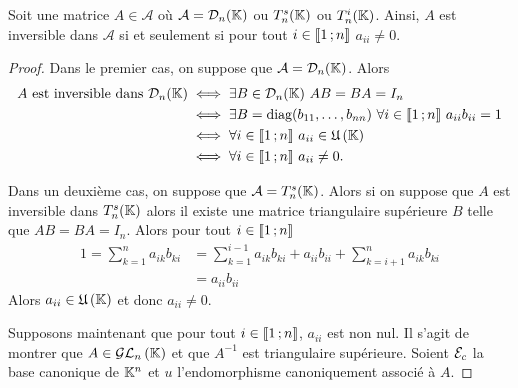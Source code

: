 \begin{prop}
  Soit une matrice \(A \in \mathcal{A}\) où \(\mathcal{A}=\mathcal{D}_n(\mathbb{K})\) ou \(T_n^s(\mathbb{K})\) ou \(T_n^i(\mathbb{K})\). Ainsi, \(A\) est inversible dans \(\mathcal{A}\) si et seulement si pour tout \(i \in \mathopen{\llbracket}1\mathclose{}\mathpunct{};n\mathclose{\rrbracket}\) \(a_{ii} \neq 0\).
\end{prop}
\begin{proof}
  Dans le premier cas, on suppose que \(\mathcal{A}=\mathcal{D}_n(\mathbb{K})\). Alors
  \begin{align}
    A \text{~est inversible dans } \mathcal{D}_n(\mathbb{K}) &\iff \exists B \in \mathcal{D}_n(\mathbb{K}) \ AB=BA=I_n \\
                                             &\iff \exists B = \text{diag}(b_{11}, \ldots, b_{nn}) \ \forall i \in \mathopen{\llbracket}1\mathclose{}\mathpunct{};n\mathclose{\rrbracket} \ a_{ii}b_{ii}=1\\
                                             &\iff \forall i \in \mathopen{\llbracket}1\mathclose{}\mathpunct{};n\mathclose{\rrbracket} \ a_{ii} \in \mathfrak{U}\left(\mathbb{K}\right)\\
                                             &\iff \forall i \in \mathopen{\llbracket}1\mathclose{}\mathpunct{};n\mathclose{\rrbracket} \ a_{ii} \neq 0.
  \end{align}

  Dans un deuxième cas, on suppose que \(\mathcal{A}=T_n^s(\mathbb{K})\). Alors si on suppose que \(A\) est inversible dans \(T_n^s(\mathbb{K})\) alors il existe une matrice triangulaire supérieure \(B\) telle que \(AB=BA=I_n\). Alors pour tout \(i \in \mathopen{\llbracket}1\mathclose{}\mathpunct{};n\mathclose{\rrbracket}\)
  \begin{align}
    1=\sum_{k=1}^n a_{ik}b_{ki} &= \sum_{k=1}^{i-1}a_{ik}b_{ki} + a_{ii}b_{ii} + \sum_{k=i+1}^{n}a_{ik}b_{ki} \\
                                &=a_{ii}b_{ii}
  \end{align}
  Alors \(a_{ii} \in \mathfrak{U}\left(\mathbb{K}\right)\) et donc \(a_{ii} \neq 0\).

  Supposons maintenant que pour tout \(i \in \mathopen{\llbracket}1\mathclose{}\mathpunct{};n\mathclose{\rrbracket}\), \(a_{ii}\) est non nul. Il s'agit de montrer que \(A \in \mathcal{GL}_{n}\left(\mathbb{K}\right)\) et que \(A^{-1}\) est triangulaire supérieure. Soient \(\mathcal{E}_c\) la base canonique de \(\mathbb{K}^n\) et \(u\) l'endomorphisme canoniquement associé à \(A\). 


\end{proof}
